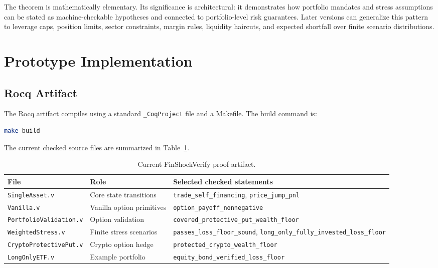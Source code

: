 \documentclass[11pt]{article}
\begin{document}
The theorem is mathematically elementary. Its significance is architectural:
it demonstrates how portfolio mandates and stress assumptions can be stated as
machine-checkable hypotheses and connected to portfolio-level risk guarantees.
Later versions can generalize this pattern to leverage caps, position limits,
sector constraints, margin rules, liquidity haircuts, and expected shortfall
over finite scenario distributions.

\section{Prototype Implementation}

\subsection{Rocq Artifact}

The Rocq artifact compiles using a standard \texttt{\_CoqProject} file and a
Makefile. The build command is:

\begin{lstlisting}[language=bash]
make build
\end{lstlisting}

The current checked source files are summarized in Table~\ref{tab:artifact}.

\begin{table}[h]
\centering
\begin{tabular}{lll}
\toprule
File & Role & Selected checked statements \\
\midrule
\texttt{SingleAsset.v} & Core state transitions &
\texttt{trade\_self\_financing}, \texttt{price\_jump\_pnl} \\
\texttt{Vanilla.v} & Vanilla option primitives &
\texttt{option\_payoff\_nonnegative} \\
\texttt{PortfolioValidation.v} & Option validation &
\texttt{covered\_protective\_put\_wealth\_floor} \\
\texttt{WeightedStress.v} & Finite stress scenarios &
\texttt{passes\_loss\_floor\_sound},
\texttt{long\_only\_fully\_invested\_loss\_floor} \\
\texttt{CryptoProtectivePut.v} & Crypto option hedge &
\texttt{protected\_crypto\_wealth\_floor} \\
\texttt{LongOnlyETF.v} & Example portfolio &
\texttt{equity\_bond\_verified\_loss\_floor} \\
\bottomrule
\end{tabular}
\caption{Current FinShockVerify proof artifact.}
\label{tab:artifact}
\end{table}
\end{document}
